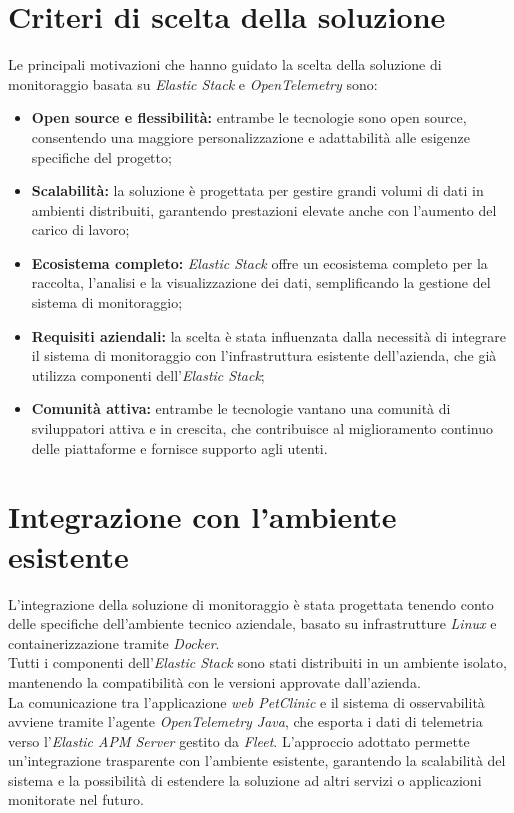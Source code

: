 \section{Criteri di scelta della soluzione}
\label{sec:criteri-scelta-soluzione}
Le principali motivazioni che hanno guidato la scelta della soluzione di monitoraggio basata su \emph{Elastic Stack} e \emph{OpenTelemetry} sono:
\begin{itemize}
    \item \textbf{Open source e flessibilità:} entrambe le tecnologie sono open source, consentendo una maggiore personalizzazione e adattabilità alle esigenze specifiche del progetto;
    \item \textbf{Scalabilità:} la soluzione è progettata per gestire grandi volumi di dati in ambienti distribuiti, garantendo prestazioni elevate anche con l'aumento del carico di lavoro;
    \item \textbf{Ecosistema completo:} \emph{Elastic Stack} offre un ecosistema completo per la raccolta, l'analisi e la visualizzazione dei dati, semplificando la gestione del sistema di monitoraggio;
    \item \textbf{Requisiti aziendali:} la scelta è stata influenzata dalla necessità di integrare il sistema di monitoraggio con l'infrastruttura esistente dell'azienda, che già utilizza componenti dell'\emph{Elastic Stack};
    \item \textbf{Comunità attiva:} entrambe le tecnologie vantano una comunità di sviluppatori attiva e in crescita, che contribuisce al miglioramento continuo delle piattaforme e fornisce supporto agli utenti.
\end{itemize}


\section{Integrazione con l'ambiente esistente}
\label{sec:integrazione-ambiente-esistente}
L'integrazione della soluzione di monitoraggio è stata progettata tenendo conto delle specifiche dell'ambiente tecnico aziendale, basato su infrastrutture \emph{Linux} e containerizzazione tramite \emph{Docker}. \\
Tutti i componenti dell'\emph{Elastic Stack} sono stati distribuiti in un ambiente isolato, mantenendo la compatibilità con le versioni approvate dall'azienda. \\
La comunicazione tra l'applicazione \emph{web PetClinic} e il sistema di osservabilità avviene tramite l'agente \emph{OpenTelemetry Java}, che esporta i dati di telemetria verso l'\emph{Elastic APM Server} gestito da \emph{Fleet}. 
L'approccio adottato permette un'integrazione trasparente con l'ambiente esistente, garantendo la scalabilità del sistema e la possibilità di estendere la soluzione ad altri servizi o applicazioni monitorate nel futuro.

